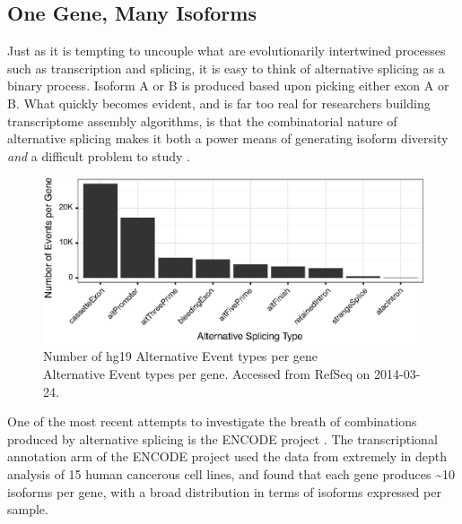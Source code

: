   \subsection{One Gene, Many Isoforms}\label{Intro:subsec:IsoformsPerGene}

    Just as it is tempting to uncouple what are evolutionarily intertwined processes such as transcription and splicing, it is easy to think of alternative splicing as a binary process. Isoform A or B is produced based upon picking either exon A or B. What quickly becomes evident, and is far too real for researchers building transcriptome assembly algorithms, is that the combinatorial nature of alternative splicing makes it both a power means of generating isoform diversity \textit{and} a difficult problem to study \citep{Trapnell2012a}.

    \begin{figure} %
      \centering 
      \includegraphics{Figures/Intro/ASEventTypesPlot.eps}
      \caption[Number of hg19 Alternative Event types per gene]
      {
        Number of hg19 Alternative Event types per gene\\[0.25cm]
        Alternative Event types per gene. Accessed from RefSeq on 2014-03-24.
        }
      \label{Intro:fig:asEventsBarChart}
      \end{figure}

    One of the most recent attempts to investigate the breath of combinations produced by alternative splicing is the ENCODE project \citep{Birney2007,Dunham2012}. The transcriptional annotation arm of the ENCODE project \citep{Djebali2012,Derrien2012} used the data from extremely in depth analysis of 15 human cancerous cell lines, and found that each gene produces \textasciitilde10 isoforms per gene, with a broad distribution in terms of isoforms expressed per sample. 

